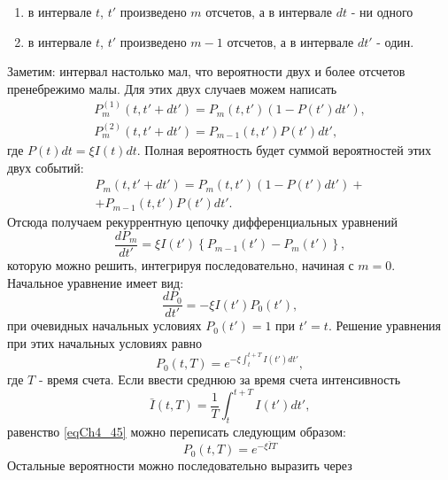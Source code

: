 \begin{enumerate}
\item в интервале $t$, $t'$ произведено $m$ отсчетов, а в интервале
  $dt$ - ни одного
\item в интервале $t$, $t'$ произведено  $m - 1$ отсчетов, а в
интервале $dt'$ - один.
\end{enumerate}
Заметим: интервал настолько мал, что вероятности двух и более отсчетов пренебрежимо малы. Для этих двух случаев можем написать
\begin{eqnarray}
P_m^{(1)}\left(t, t' + dt'\right) = 
P_m\left(t, t'\right)\left(1 - P\left(t'\right)dt'\right),
\nonumber \\
P_m^{(2)}\left(t, t' + dt'\right) = 
P_{m - 1}\left(t, t'\right)P\left(t'\right)dt',
\label{eqCh4_41}
\end{eqnarray}
где $P\left(t\right)dt = \xi I\left(t\right)dt$.  
Полная вероятность будет суммой вероятностей этих двух событий:
\begin{eqnarray}
P_m\left(t, t' + dt'\right) = 
P_m\left(t, t'\right)\left(1 - P\left(t'\right)dt'\right) +
\nonumber \\
+
P_{m - 1}\left(t, t'\right)P\left(t'\right)dt'.
\label{eqCh4_42}
\end{eqnarray}
Отсюда получаем рекуррентную цепочку дифференциальных уравнений
\begin{equation}
\frac{dP_m}{dt'} = \xi I\left(t'\right)\left\{P_{m - 1}\left(t'\right)
- P_m\left(t'\right)\right\},
\label{eqCh4_43}
\end{equation}
которую можно решить, интегрируя последовательно, начиная с $m =
0$. Начальное уравнение имеет вид: 
\begin{equation}
\frac{dP_0}{dt'} = - \xi I\left(t'\right) P_0\left(t'\right),
\label{eqCh4_44}
\end{equation}
при очевидных начальных условиях $P_0\left(t'\right) = 1$ при $t' =
t$.  Решение уравнения при этих начальных условиях равно 
\begin{equation}
P_0\left(t, T\right) = e^{- \xi \int_t^{t + T} I\left(t'\right) d t'}, 
\label{eqCh4_45}
\end{equation}
где $T$ - время счета. Если ввести среднюю за время счета
интенсивность 
\[
\bar{I}\left(t, T\right) = \frac{1}{T}
\int_t^{t + T}I\left(t'\right)dt',
\]
равенство \eqref{eqCh4_45} можно переписать следующим образом:
\begin{equation}
P_0\left(t, T\right) = e^{- \xi \bar{I} T}
\label{eqCh4_46}
\end{equation}
Остальные вероятности можно последовательно выразить через
